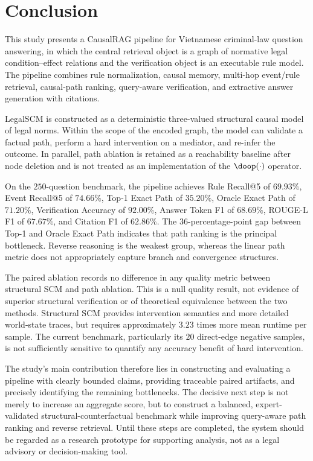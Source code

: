 \section{Conclusion}
\label{sec:conclusion}

This study presents a CausalRAG pipeline for Vietnamese criminal-law
question answering, in which the central retrieval object is a graph of
normative legal condition--effect relations and the verification object is
an executable rule model. The pipeline combines rule normalization, causal
memory, multi-hop event/rule retrieval, causal-path ranking, query-aware
verification, and extractive answer generation with citations.

LegalSCM is constructed as a deterministic three-valued structural causal
model of legal norms. Within the scope of the encoded graph, the model can
validate a factual path, perform a hard intervention on a mediator, and
re-infer the outcome. In parallel, path ablation is retained as a
reachability baseline after node deletion and is not treated as an
implementation of the $\doop(\cdot)$ operator.

On the $250$-question benchmark, the pipeline achieves Rule Recall@5 of
$69.93\%$, Event Recall@5 of $74.66\%$, Top-1 Exact Path of $35.20\%$,
Oracle Exact Path of $71.20\%$, Verification Accuracy of $92.00\%$, Answer
Token F1 of $68.69\%$, ROUGE-L F1 of $67.67\%$, and Citation F1 of
$62.86\%$. The $36$-percentage-point gap between Top-1 and Oracle Exact Path
indicates that path ranking is the principal bottleneck. Reverse reasoning
is the weakest group, whereas the linear path metric does not appropriately
capture branch and convergence structures.

The paired ablation records no difference in any quality metric between
structural SCM and path ablation. This is a null quality result, not evidence
of superior structural verification or of theoretical equivalence between
the two methods. Structural SCM provides intervention semantics and more
detailed world-state traces, but requires approximately $3.23$ times more
mean runtime per sample. The current benchmark, particularly its $20$
direct-edge negative samples, is not sufficiently sensitive to quantify any
accuracy benefit of hard intervention.

The study's main contribution therefore lies in constructing and evaluating
a pipeline with clearly bounded claims, providing traceable paired
artifacts, and precisely identifying the remaining bottlenecks. The decisive
next step is not merely to increase an aggregate score, but to construct a
balanced, expert-validated structural-counterfactual benchmark while
improving query-aware path ranking and reverse retrieval. Until these steps
are completed, the system should be regarded as a research prototype for
supporting analysis, not as a legal advisory or decision-making tool.
